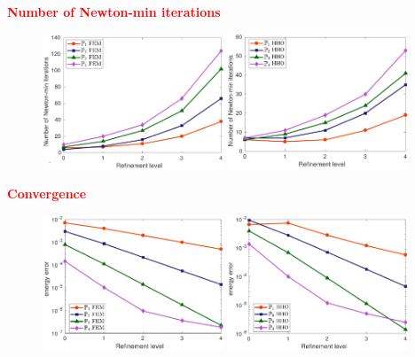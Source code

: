 \begin{frame}
  \textcolor{red}{\textbf{Number of Newton-min iterations}}
  \vspace*{0.3 cm}
\begin{figure}
\centering
\includegraphics[width=0.48\textwidth]{Number_of_Newton_iter_refinment_level} \quad
\includegraphics[width=0.48\textwidth]{nb_iter_Newton_HH0}
\end{figure}
  \end{frame}
\begin{frame}
\textcolor{red}{\textbf{Convergence}}
  \begin{figure}
\centering
\includegraphics[width=0.48\textwidth]{energy_error_FEM} \quad
\includegraphics[width=0.48\textwidth]{energy_error_HHO}
\end{figure}
  \end{frame}
